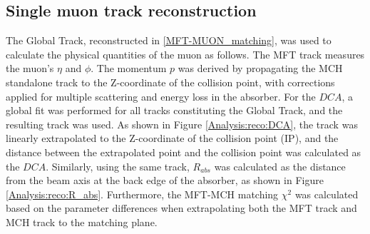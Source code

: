     \subsection{Single muon track reconstruction}
    \label{Single_reco}
        The Global Track, reconstructed in \ref{MFT-MUON_matching}, was used to calculate the physical quantities of the muon as follows. The MFT track measures the muon's $\eta$ and $\phi$. The momentum $p$ was derived by propagating the MCH standalone track to the Z-coordinate of the collision point, with corrections applied for multiple scattering and energy loss in the absorber.
        For the $DCA$, a global fit was performed for all tracks constituting the Global Track, and the resulting track was used.
        As shown in Figure \ref{Analysis:reco:DCA}, the track was linearly extrapolated to the Z-coordinate of the collision point (IP), and the distance between the extrapolated point and the collision point was calculated as the $DCA$. Similarly, using the same track, $R_{abs}$ was calculated as the distance from the beam axis at the back edge of the absorber, as shown in Figure \ref{Analysis:reco:R_abs}.
        Furthermore, the MFT-MCH matching $\chi^2$ was calculated based on the parameter differences when extrapolating both the MFT track and MCH track to the matching plane.
